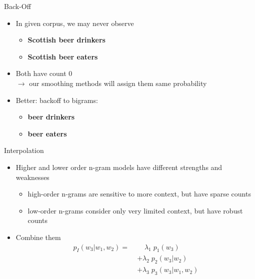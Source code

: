 \documentclass[compress]{beamer}
\begin{document}
\begin{frame}{Back-Off}

\begin{itemize}
\item In given corpus, we may never observe
\begin{itemize}
\item {\bf Scottish beer drinkers}
\item {\bf Scottish beer eaters}
\end{itemize}
\item Both have count 0\\[2mm]
$\rightarrow$ our smoothing methods will assign them same probability
\item Better: backoff to bigrams:
\begin{itemize}
\item {\bf beer drinkers}
\item {\bf beer eaters}
\end{itemize}
\end{itemize}


\end{frame}


\begin{frame}{Interpolation}
\begin{itemize}
\item Higher and lower order n-gram models have different strengths and weaknesses
\begin{itemize}
\item high-order n-grams are sensitive to more context, but have sparse counts
\item low-order n-grams consider only very limited context, but have robust counts
\end{itemize}
\item Combine them
\begin{equation*}
\begin{split}
p_I(w_3|w_1,w_2) = \; & \phantom{\times \;} \lambda_1 \; p_1(w_3) \\
& + \lambda_2 \; p_2(w_3|w_2) \\
& + \lambda_3 \; p_3(w_3|w_1,w_2)
\end{split}
\end{equation*}
\end{itemize}

\end{frame}

\end{document}
